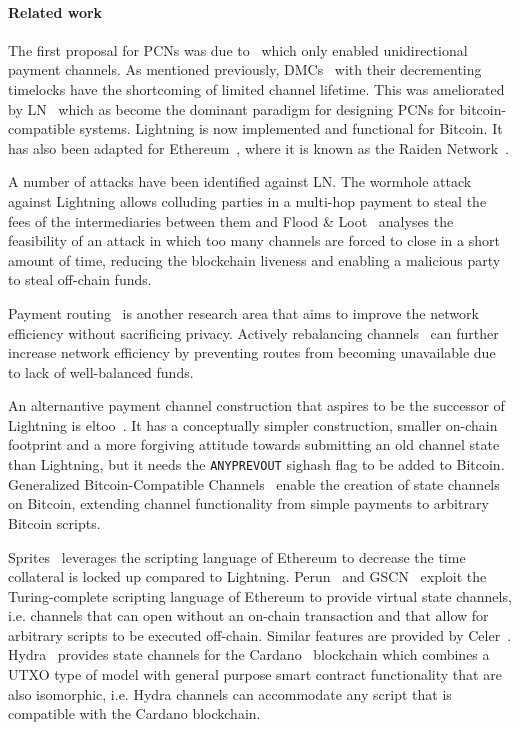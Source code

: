 
\paragraph{Related work}
 The first proposal for PCNs was due to~\cite{spilman} which only enabled
 unidirectional payment channels. As mentioned previously, DMCs~\cite{decker} with their decrementing timelocks have the shortcoming of limited channel lifetime. This was ameliorated by LN~\cite{lightning} which as become the dominant paradigm for designing PCNs for bitcoin-compatible systems. 
 Lightning is now implemented and functional for
  Bitcoin. It has also been adapted for Ethereum~\cite{wood2014ethereum}, where
  it is known as the Raiden Network~\cite{raiden}.

A number of attacks have been identified against LN. The wormhole
  attack~\cite{DBLP:conf/ndss/MalavoltaMSKM19} against Lightning allows
  colluding parties in a multi-hop payment to steal the fees of the
  intermediaries between them and Flood \& Loot~\cite{10.1145/3419614.3423248}
  analyses the feasibility of an attack in which too many channels are forced to
  close in a short amount of time, reducing the blockchain liveness and enabling
  a malicious party to steal off-chain funds.

  Payment routing~\cite{spider,prihodko2016flare,lee2020routee} is another research area that aims to improve the network efficiency without sacrificing  privacy. Actively rebalancing channels~\cite{DBLP:conf/ccs/KhalilG17} can
  further increase network efficiency by preventing routes from becoming   unavailable due to lack of well-balanced funds.

  An alternantive payment channel construction that aspires to be the successor
  of Lightning is eltoo~\cite{eltoo}. It has a conceptually simpler
  construction, smaller on-chain footprint and a more forgiving attitude towards
  submitting an old channel state than Lightning, but it needs the
  \texttt{ANYPREVOUT} sighash flag to be added to Bitcoin. Generalized
  Bitcoin-Compatible Channels~\cite{cryptoeprint:2020:476} enable the creation
  of state channels on Bitcoin, extending channel functionality from simple
  payments to arbitrary Bitcoin scripts.

  Sprites~\cite{sprites} leverages the scripting language of Ethereum to
  decrease the time collateral is locked up compared to Lightning.
  Perun~\cite{perun} and GSCN~\cite{DBLP:conf/ccs/DziembowskiFH18} exploit the
  Turing-complete scripting language of Ethereum to provide virtual state
  channels, i.e. channels that can open without an on-chain transaction and that
  allow for arbitrary scripts to be executed off-chain. Similar features are
  provided by Celer~\cite{dong2018celer}. Hydra~\cite{cryptoeprint:2020:299}
  provides state channels for the Cardano~\cite{cardano} blockchain which
  combines a UTXO type of model with general purpose smart contract
  functionality that are also isomorphic, i.e. Hydra channels can accommodate
  any script that is compatible with the Cardano blockchain.

